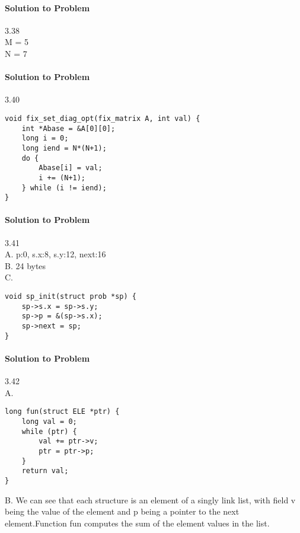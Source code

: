 \documentclass{report}
\begin{document}
\paragraph{Solution to Problem } 3.38\\
M = 5 \\
N = 7

\paragraph{Solution to Problem } 3.40\\
\begin{lstlisting}
void fix_set_diag_opt(fix_matrix A, int val) {
    int *Abase = &A[0][0];
    long i = 0;
    long iend = N*(N+1);
    do {
        Abase[i] = val;
        i += (N+1);
    } while (i != iend);
}
\end{lstlisting}

\paragraph{Solution to Problem } 3.41\\
A. p:0, s.x:8, s.y:12, next:16 \\
B. 24 bytes \\
C. 
\begin{lstlisting}
void sp_init(struct prob *sp) {
    sp->s.x = sp->s.y;
    sp->p = &(sp->s.x);
    sp->next = sp;
}
\end{lstlisting}

\paragraph{Solution to Problem } 3.42\\ 
A.
\begin{lstlisting}
long fun(struct ELE *ptr) {
    long val = 0;
    while (ptr) {
        val += ptr->v;
        ptr = ptr->p;
    }
    return val;
}
\end{lstlisting}
B. We can see that each structure is an element of a singly link list, with field v being the value of the element and p being a pointer to the next element.Function fun computes the sum of the element values in the list.
\end{document}
